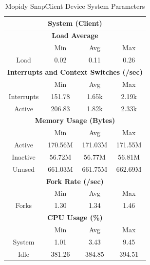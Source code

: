 \documentclass[11pt,a4paper]{scrreprt}
\begin{document}
\begin{table}[H]
\centering
    \begin{tabular}{||c|c|c|c|c|c|c||}
    \hline
    \multicolumn{7}{|c|}{\textbf{System (Client)}} \\
    \hline
    \multicolumn{7}{|c|}{\textbf{Load Average}} \\
    \hline\hline
      & \multicolumn{2}{|c|}{Min} & \multicolumn{2}{|c|}{Avg} & \multicolumn{2}{|c|}{Max} \\
    \hline
    Load & \multicolumn{2}{|c|}{0.02} & \multicolumn{2}{|c|}{0.11} & \multicolumn{2}{|c|}{0.26} \\
    \hline\hline
    \multicolumn{7}{|c|}{\textbf{Interrupts and Context Switches (/sec)}} \\
    \hline
      & \multicolumn{2}{|c|}{Min} & \multicolumn{2}{|c|}{Avg} & \multicolumn{2}{|c|}{Max} \\
    \hline
    Interrupts & \multicolumn{2}{|c|}{151.78} & \multicolumn{2}{|c|}{1.65k} & \multicolumn{2}{|c|}{2.19k} \\
    \hline
    Active & \multicolumn{2}{|c|}{206.83} & \multicolumn{2}{|c|}{1.82k} & \multicolumn{2}{|c|}{2.33k} \\
    \hline\hline
    \multicolumn{7}{|c|}{\textbf{Memory Usage (Bytes)}} \\
    \hline\hline
      & \multicolumn{2}{|c|}{Min} & \multicolumn{2}{|c|}{Avg} & \multicolumn{2}{|c|}{Max} \\
    \hline
    Active & \multicolumn{2}{|c|}{170.56M} & \multicolumn{2}{|c|}{171.03M} & \multicolumn{2}{|c|}{171.55M} \\
    \hline
    Inactive & \multicolumn{2}{|c|}{56.72M} & \multicolumn{2}{|c|}{56.77M} & \multicolumn{2}{|c|}{56.81M} \\
    \hline
    Unused & \multicolumn{2}{|c|}{661.03M} & \multicolumn{2}{|c|}{661.75M} & \multicolumn{2}{|c|}{662.69M} \\
    \hline\hline
    \multicolumn{7}{|c|}{\textbf{Fork Rate (/sec)}} \\
    \hline\hline
      & \multicolumn{2}{|c|}{Min} & \multicolumn{2}{|c|}{Avg} & \multicolumn{2}{|c|}{Max} \\
    \hline
    Forks & \multicolumn{2}{|c|}{1.30} & \multicolumn{2}{|c|}{1.34} & \multicolumn{2}{|c|}{1.46} \\
    \hline\hline
    \multicolumn{7}{|c|}{\textbf{CPU Usage (\%)}} \\
    \hline\hline
      & \multicolumn{2}{|c|}{Min} & \multicolumn{2}{|c|}{Avg} & \multicolumn{2}{|c|}{Max} \\
    \hline
    System & \multicolumn{2}{|c|}{1.01} & \multicolumn{2}{|c|}{3.43} & \multicolumn{2}{|c|}{9.45} \\
    \hline
    Idle & \multicolumn{2}{|c|}{381.26} & \multicolumn{2}{|c|}{384.85} & \multicolumn{2}{|c|}{394.51} \\
    \hline\hline
    \end{tabular}
    \caption{Mopidy SnapClient Device System Parameters}
    \label{MopidyclientSysTab}
\end{table}
\end{document}
